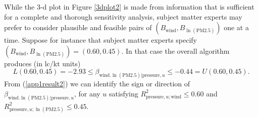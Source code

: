 \documentclass[11pt]{amsart}
\begin{document}



While the 3-d plot in Figure \ref{3dplot2} is made from information that is sufficient for a complete and thorough sensitivity analysis, subject matter experts may prefer to consider plausible and feasible pairs of $(B_{\textrm{wind}},B_{\ln(\textrm{PM2.5})})$ one at a time. Suppose for instance that subject matter experts specify $(B_{\textrm{wind}},B_{\ln(\textrm{PM2.5})})=(0.60,0.45)$. In that case the overall algorithm produces (in lc/kt units)
\begin{equation}\label{app1result2}L(0.60,0.45)=-2.93\le\beta_{\textrm{wind}.\ln(\textrm{PM2.5})|\textrm{pressure},u} \le -0.44=U(0.60,0.45).\end{equation}
From (\ref{app1result2}) we can identify the sign or direction of $\beta_{\textrm{wind}.\ln(\textrm{PM2.5})|\textrm{pressure},u}$, for any $u$ satisfying $R^2_{\textrm{pressure},u;\textrm{wind}}\leq 0.60$ and $R^2_{\textrm{pressure},u;\ln(\textrm{PM2.5})}\leq 0.45$. 
\end{document}

